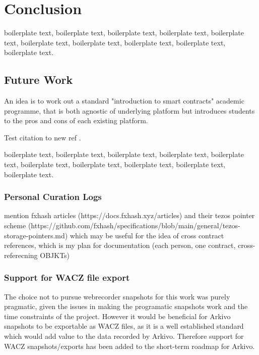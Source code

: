 \chapter{Conclusion}


boilerplate text, boilerplate text, boilerplate text, boilerplate text, boilerplate text, boilerplate text, boilerplate text, boilerplate text, boilerplate text, boilerplate text.


\section{Future Work}


An idea is to work out a standard "introduction to smart contracts" academic programme, that is both agnostic of underlying platform but introduces students to the pros and cons of each existing platform.

Test citation to new ref  \cite{dekkerCollectingConservingNet2018}.

boilerplate text, boilerplate text, boilerplate text, boilerplate text, boilerplate text, boilerplate text, boilerplate text, boilerplate text, boilerplate text, boilerplate text.


\subsection{Personal Curation Logs}

mention fxhash articles (https://docs.fxhash.xyz/articles) and their tezos pointer scheme (https://github.com/fxhash/specifications/blob/main/general/tezos-storage-pointers.md) which may be useful for the idea of cross contract references, which is my plan for documentation (each person, one contract, cross-referecning OBJKTs)

\subsection{Support for WACZ file export}

The choice not to pursue webrecorder snapshots for this work was purely pragmatic, given the issues in making the programatic snapshots work and the time constraints of the project. However it would be beneficial for Arkivo snapshots to be exportable as WACZ files, as it is a well established standard which would add value to the data recorded by Arkivo. Therefore support for WACZ snapshots/exports has been added to the short-term roadmap for Arkivo.
